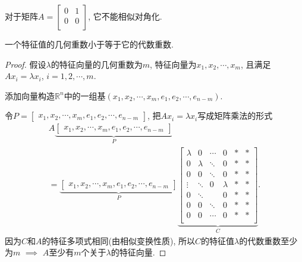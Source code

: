 \begin{example}
    对于矩阵$A = \begin{bmatrix}
     0 & 1\\
     0 & 0\\
    \end{bmatrix}$, 它不能相似对角化. 
\end{example}

\begin{theorem}
    一个特征值的几何重数小于等于它的代数重数.
\end{theorem}

\begin{proof}
    假设$\lambda$的特征向量的几何重数为$m$, 特征向量为$x_1,x_2,\cdots,x_m$, 且满足$A x_i = \lambda x_i$, $i = 1, 2, \cdots, m$.

    添加向量构造$\mathbb{R}^{n}$中的一组基$\left( x_1,x_2,\cdots,x_m, e_1,e_2,\cdots,e_{n-m} \right) $. 
    
    令$P = \begin{bmatrix} x_1,x_2,\cdots,x_m, e_1,e_2,\cdots,e_{n-m} \end{bmatrix}$, 把$Ax_i = \lambda x_i $写成矩阵乘法的形式
    \begin{equation}
        \begin{gathered}
            A \underbrace{\begin{bmatrix} x_1,x_2,\cdots,x_m, e_1,e_2,\cdots,e_{n-m} \end{bmatrix}}_{P} 
            \\
            =
            \underbrace{\begin{bmatrix} x_1,x_2,\cdots,x_m, e_1,e_2,\cdots,e_{n-m} \end{bmatrix}}_{P} 
            \underbrace{\left[ 
                \begin{array}{cccc|cc}
                    \lambda &0 & \cdots& 0&* &* \\
                    0& \lambda &\ddots & 0&* &* \\
                    0& 0& \ddots & 0&* &* \\
                    \vdots& \ddots&  0& \lambda &* &* \\
                    \hline
                    0& \ddots& &0 &*  &* \\
                    0& 0& \ddots & 0& *& * \\
                    0& 0&\cdots &0& *& * \\
                    \end{array}
             \right] 
            }_{C}.
        \end{gathered}
    \end{equation}
    因为$C$和$A$的特征多项式相同(由相似变换性质), 所以$C$的特征值$\lambda$的代数重数至少为$m$ $\implies$ $A$至少有$m$个关于$\lambda$的特征向量.
\end{proof}

